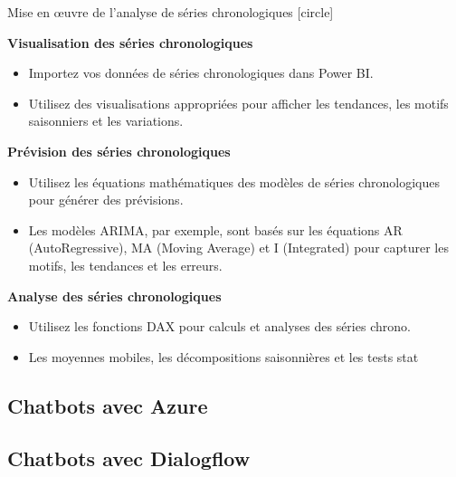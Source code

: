 \documentclass{beamer}
\begin{document}
\begin{frame}[t]{Mise en œuvre de l'analyse de séries chronologiques}
	[circle]
	
	\textbf{Visualisation des séries chronologiques}
	\begin{itemize}
		\item Importez vos données de séries chronologiques dans Power BI.
		\item Utilisez des visualisations appropriées pour afficher les tendances, les motifs saisonniers et les variations.
	\end{itemize}
	
	\vspace{0.3cm}
	\textbf{Prévision des séries chronologiques}
	\begin{itemize}
		\item Utilisez les équations mathématiques des modèles de séries chronologiques pour générer des prévisions.
		\item Les modèles ARIMA, par exemple, sont basés sur les équations AR (AutoRegressive), MA (Moving Average) et I (Integrated) pour capturer les motifs, les tendances et les erreurs.
	\end{itemize}
	
	\vspace{0.3cm}
	\textbf{Analyse des séries chronologiques}
	\begin{itemize}
		\item Utilisez les fonctions DAX pour calculs et analyses des séries chrono.
		\item Les moyennes mobiles, les décompositions saisonnières et les tests stat
	\end{itemize}
\end{frame}

\subsection{Chatbots avec Azure}





\subsection{Chatbots avec Dialogflow}
\end{document}
